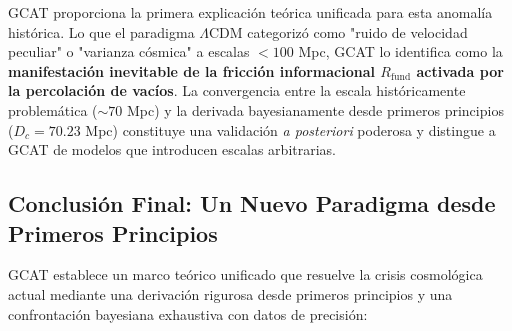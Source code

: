 \documentclass[12pt, a4paper]{article}
\theoremstyle{plain}
\theoremstyle{definition}
\begin{document}
GCAT proporciona la primera explicación teórica unificada para esta anomalía histórica. Lo que el paradigma $\Lambda$CDM categorizó como "ruido de velocidad peculiar" o "varianza cósmica" a escalas $<100$ Mpc, GCAT lo identifica como la \textbf{manifestación inevitable de la fricción informacional $R_{\text{fund}}$ activada por la percolación de vacíos}. La convergencia entre la escala históricamente problemática ($\sim 70$ Mpc) y la derivada bayesianamente desde primeros principios ($D_c = 70.23$ Mpc) constituye una validación \textit{a posteriori} poderosa y distingue a GCAT de modelos que introducen escalas arbitrarias.

\subsection{Conclusión Final: Un Nuevo Paradigma desde Primeros Principios}

GCAT establece un marco teórico unificado que resuelve la crisis cosmológica actual mediante una derivación rigurosa desde primeros principios y una confrontación bayesiana exhaustiva con datos de precisión:
\end{document}
